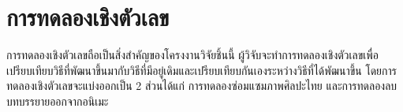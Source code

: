 \chapter{การทดลองเชิงตัวเลข}

\hspace{1cm} การทดลองเชิงตัวเลขถือเป็นสิ่งสำคัญของโครงงานวิจัยชิ้นนี้ ผู้วิจับจะทำการทดลองเชิงตัวเลขเพื่อเปรียบเทียบวิธีที่พัฒนาขึ้นมากับวิธีที่มีอยู่เดิมและเปรียบเทียบกันเองระหว่างวิธีที่ได้พัฒนาขึ้น โดยการทดลองเชิงตัวเลขจะแบ่งออกเป็น 2 ส่วนได้แก่ การทดลองซ่อมแซมภาพศิลปะไทย และการทดลองลบบทบรรยายออกจากอนิเมะ 



\clearpage